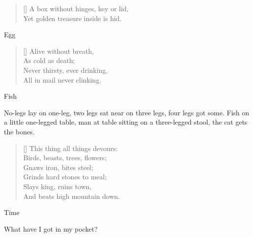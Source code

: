 \documentclass[grid,avery5371]{flashcards}
\begin{document}
\begin{flashcard}[Bilbo]{%
\begin{verse}[\versewidth]
A box without hinges, key or lid,\\
Yet golden treasure inside is hid.
\end{verse}}
Egg
\end{flashcard}

\begin{flashcard}[Gollum]{%
\begin{verse}[\versewidth]
Alive without breath,\\
As cold as death;\\
Never thirsty, ever drinking,\\
All in mail never clinking.
\end{verse}}
Fish
\end{flashcard}

\begin{flashcard}[Bilbo]{%
No-legs lay on one-leg, two legs sat near on three legs, four legs got some.}
Fish on a little one-legged table, man at table sitting on a three-legged stool, the cat gets the bones.
\end{flashcard}

\begin{flashcard}[Gollum]{
\begin{verse}[\versewidth]
This thing all things devours:\\
Birds, beasts, trees, flowers;\\
Gnaws iron, bites steel;\\
Grinds hard stones to meal;\\
Slays king, ruins town,\\
And beats high mountain down.
\end{verse}}
Time
\end{flashcard}

\begin{flashcard}[Bilbo]{What have I got in my pocket?}
~
\end{flashcard}
\end{document}

